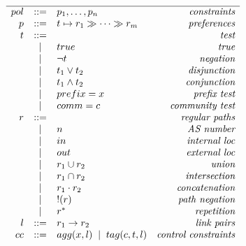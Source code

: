 \begin{figure}
  \begin{minipage}[t]{.45\linewidth}
  \vspace*{-1\baselineskip}
  \[ \begin{array}{rclr}
    \hline

     pol     &::=& p_1, \dots, p_n & \textit{constraints} \\
     p       &::=& t \mapsto r_1 \gg \dots \gg r_m & \textit{preferences} \\
     t       &::=& & \textit{test} \\
         &\;\;|\;\;& true & \textit{true} \\
         &\;\;|\;\;& \neg t & \textit{negation} \\
         &\;\;|\;\;& t_1 \vee t_2 & \textit{disjunction} \\
         &\;\;|\;\;& t_1 \wedge t_2 & \textit{conjunction} \\
         &\;\;|\;\;& prefix = x & \textit{prefix test} \\
         &\;\;|\;\;& comm = c & \textit{community test} \\
     r       &::=& & \textit{regular paths} \\ 
         &\;\;|\;\;& n & \textit{AS number} \\
         &\;\;|\;\;& in & \textit{internal loc} \\
         &\;\;|\;\;& out & \textit{external loc} \\
         &\;\;|\;\;& r_1 \cup r_2 & \textit{union} \\
         &\;\;|\;\;& r_1 \cap r_2 & \textit{intersection} \\
         &\;\;|\;\;& r_1 \cdot r_2 & \textit{concatenation} \\
         &\;\;|\;\;& !(r) & \textit{path negation} \\
         &\;\;|\;\;& r^* & \textit{repetition} \\
     l       &::=& r_1 \rightarrow r_2 & \textit{link pairs} \\
     cc     &::=& agg(x, l) \;\;|\;\; tag(c, t, l) & \textit{control constraints} \\
  \end{array} \]


\end{minipage}
\end{figure}
